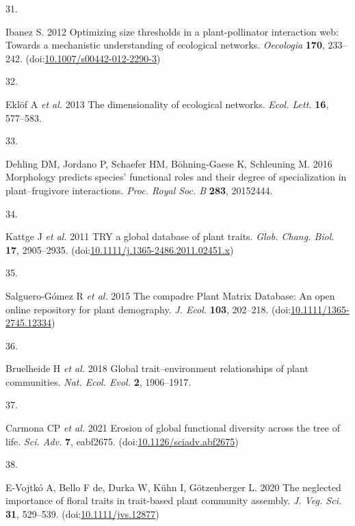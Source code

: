 \documentclass[
  12pt,
  a4paper,
]{article}
\newlength{\cslhangindent}
\newlength{\csllabelwidth}
\newlength{\cslentryspacingunit} %
\newenvironment{CSLReferences}[2] %
 {%
  \setlength{\parindent}{0pt}
  \ifodd #1
  \let\oldpar\par
  \def\par{\hangindent=\cslhangindent\oldpar}
  \fi
  \setlength{\parskip}{#2\cslentryspacingunit}
 }%
 {}
\newcommand{\CSLLeftMargin}[1]{\parbox[t]{\csllabelwidth}{#1}}
\newcommand{\CSLRightInline}[1]{\parbox[t]{\linewidth - \csllabelwidth}{#1}\break}
\begin{document}
\begin{CSLReferences}{0}{0}
\leavevmode{}%
\CSLLeftMargin{31. }
\CSLRightInline{Ibanez S. 2012 Optimizing size thresholds in a plant-pollinator interaction web: Towards a mechanistic understanding of ecological networks. \emph{Oecologia} \textbf{170}, 233--242. (doi:\href{https://doi.org/10.1007/s00442-012-2290-3}{10.1007/s00442-012-2290-3})}

\leavevmode{}%
\CSLLeftMargin{32. }
\CSLRightInline{Eklöf A \emph{et al.} 2013 The dimensionality of ecological networks. \emph{Ecol. Lett.} \textbf{16}, 577--583.}

\leavevmode{}%
\CSLLeftMargin{33. }
\CSLRightInline{Dehling DM, Jordano P, Schaefer HM, Böhning-Gaese K, Schleuning M. 2016 Morphology predicts species' functional roles and their degree of specialization in plant--frugivore interactions. \emph{Proc. Royal Soc. B} \textbf{283}, 20152444.}

\leavevmode{}%
\CSLLeftMargin{34. }
\CSLRightInline{Kattge J \emph{et al.} 2011 {TRY} \textendash{} a global database of plant traits. \emph{Glob. Chang. Biol.} \textbf{17}, 2905--2935. (doi:\href{https://doi.org/10.1111/j.1365-2486.2011.02451.x}{10.1111/j.1365-2486.2011.02451.x})}

\leavevmode{}%
\CSLLeftMargin{35. }
\CSLRightInline{Salguero-Gómez R \emph{et al.} 2015 The compadre {Plant Matrix Database}: An open online repository for plant demography. \emph{J. Ecol.} \textbf{103}, 202--218. (doi:\href{https://doi.org/10.1111/1365-2745.12334}{10.1111/1365-2745.12334})}

\leavevmode{}%
\CSLLeftMargin{36. }
\CSLRightInline{Bruelheide H \emph{et al.} 2018 Global trait--environment relationships of plant communities. \emph{Nat. Ecol. Evol.} \textbf{2}, 1906--1917.}

\leavevmode{}%
\CSLLeftMargin{37. }
\CSLRightInline{Carmona CP \emph{et al.} 2021 Erosion of global functional diversity across the tree of life. \emph{Sci. Adv.} \textbf{7}, eabf2675. (doi:\href{https://doi.org/10.1126/sciadv.abf2675}{10.1126/sciadv.abf2675})}

\leavevmode{}%
\CSLLeftMargin{38. }
\CSLRightInline{E-Vojtkó A, Bello F de, Durka W, Kühn I, Götzenberger L. 2020 The neglected importance of floral traits in trait-based plant community assembly. \emph{J. Veg. Sci.} \textbf{31}, 529--539. (doi:\href{https://doi.org/10.1111/jvs.12877}{10.1111/jvs.12877})}


\end{CSLReferences}
\end{document}
